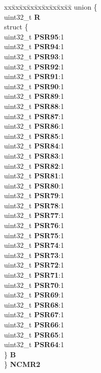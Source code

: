 \begin{DoxyCompactItemize}
\begin{tabbing}
\end{tabbing}\item 
\mbox{\label{structADC__tag_ab311938380c2c82c677d21874846484d}} 
\begin{tabbing}
xx\=xx\=xx\=xx\=xx\=xx\=xx\=xx\=xx\=\kill
union \{\\
\>uint32\_t {\bfseries R}\\
\>struct \{\\
\>\>uint32\_t {\bfseries PSR95}:1\\
\>\>uint32\_t {\bfseries PSR94}:1\\
\>\>uint32\_t {\bfseries PSR93}:1\\
\>\>uint32\_t {\bfseries PSR92}:1\\
\>\>uint32\_t {\bfseries PSR91}:1\\
\>\>uint32\_t {\bfseries PSR90}:1\\
\>\>uint32\_t {\bfseries PSR89}:1\\
\>\>uint32\_t {\bfseries PSR88}:1\\
\>\>uint32\_t {\bfseries PSR87}:1\\
\>\>uint32\_t {\bfseries PSR86}:1\\
\>\>uint32\_t {\bfseries PSR85}:1\\
\>\>uint32\_t {\bfseries PSR84}:1\\
\>\>uint32\_t {\bfseries PSR83}:1\\
\>\>uint32\_t {\bfseries PSR82}:1\\
\>\>uint32\_t {\bfseries PSR81}:1\\
\>\>uint32\_t {\bfseries PSR80}:1\\
\>\>uint32\_t {\bfseries PSR79}:1\\
\>\>uint32\_t {\bfseries PSR78}:1\\
\>\>uint32\_t {\bfseries PSR77}:1\\
\>\>uint32\_t {\bfseries PSR76}:1\\
\>\>uint32\_t {\bfseries PSR75}:1\\
\>\>uint32\_t {\bfseries PSR74}:1\\
\>\>uint32\_t {\bfseries PSR73}:1\\
\>\>uint32\_t {\bfseries PSR72}:1\\
\>\>uint32\_t {\bfseries PSR71}:1\\
\>\>uint32\_t {\bfseries PSR70}:1\\
\>\>uint32\_t {\bfseries PSR69}:1\\
\>\>uint32\_t {\bfseries PSR68}:1\\
\>\>uint32\_t {\bfseries PSR67}:1\\
\>\>uint32\_t {\bfseries PSR66}:1\\
\>\>uint32\_t {\bfseries PSR65}:1\\
\>\>uint32\_t {\bfseries PSR64}:1\\
\>\} {\bfseries B}\\
\} {\bfseries NCMR2}\\


\end{tabbing}
\end{DoxyCompactItemize}
